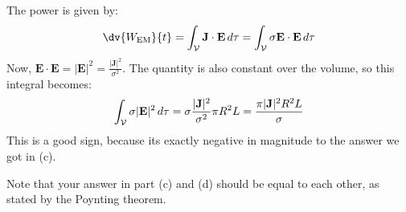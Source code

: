 \documentclass[10pt]{article}
\begin{document}
\begin{enumerate}[label=(\alph*), resume]
			\begin{solution}
				The power is given by:
				\[
					\dv{W_\text{EM}}{t} = \int_{\mathcal{V}} \mathbf{J} \cdot \mathbf{E} \diff \tau =
					\int_{\mathcal{V}} \sigma \mathbf{E} \cdot \mathbf{E} \diff \tau
				\]
				Now, \( \mathbf{E} \cdot \mathbf{E} = |\mathbf{E}|^2 = \frac{|\mathbf{J}|^2}{\sigma^2} \).
				The quantity is also constant over the volume, so this integral becomes:
				\[
					\int_{\mathcal{V}} \sigma |\mathbf{E}|^2 \,d \tau = \sigma
					\frac{|\mathbf{J}|^2}{\sigma^2} \pi R^2 L = \frac{\pi |\mathbf{J}|^2 R^2 L}{\sigma}
				\]
				This is a good sign, because its exactly negative in magnitude to the answer we got in (c).  
			\end{solution}
	\end{enumerate}
	Note that your answer in part (c) and (d) should be equal to each other, as stated by the Poynting
	theorem. 

	\pagebreak
\end{document}
